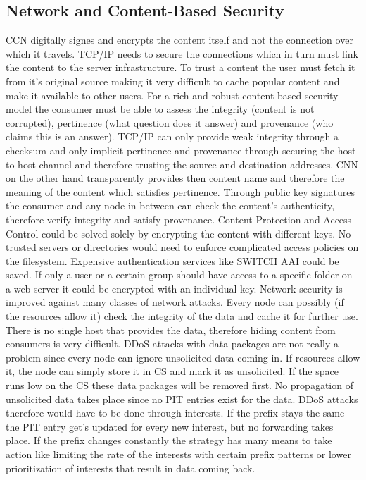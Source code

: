 \subsection{Network and Content-Based Security}

CCN digitally signes and encrypts the content itself and not the connection over which it travels. TCP/IP needs to secure the connections which in turn must link the content to the server infrastructure. To trust a content the user must fetch it from it's original source making it very difficult to cache popular content and make it available to other users. For a rich and robust content-based security model the consumer must be able to assess the integrity (content is not corrupted), pertinence (what question does it answer) and provenance (who claims this is an answer). TCP/IP can only provide weak integrity through a checksum and only implicit pertinence and provenance through securing the host to host channel and therefore trusting the source and destination addresses. CNN on the other hand transparently provides then content name and therefore the meaning of the content which satisfies pertinence. Through public key signatures the consumer and any node in between can check the content's authenticity, therefore verify integrity and satisfy provenance.
Content Protection and Access Control could be solved solely by encrypting the content with different keys. No trusted servers or directories would need to enforce complicated access policies on the filesystem. Expensive authentication services like SWITCH AAI could be saved. If only a user or a certain group should have access to a specific folder on a web server it could be encrypted with an individual key.
Network security is improved against many classes of network attacks. Every node can possibly (if the resources allow it) check the integrity of the data and cache it for further use. There is no single host that provides the data, therefore hiding content from consumers is very difficult.
DDoS attacks with data packages are not really a problem since every node can ignore unsolicited data coming in. If resources allow it, the node can simply store it in CS and mark it as unsolicited. If the space runs low on the CS these data packages will be removed first. No propagation of unsolicited data takes place since no PIT entries exist for the data. DDoS attacks therefore would have to be done through interests. If the prefix stays the same the PIT entry get's updated for every new interest, but no forwarding takes place. If the prefix changes constantly the strategy has many means to take action like limiting the rate of the interests with certain prefix patterns or lower prioritization of interests that result in data coming back. 

